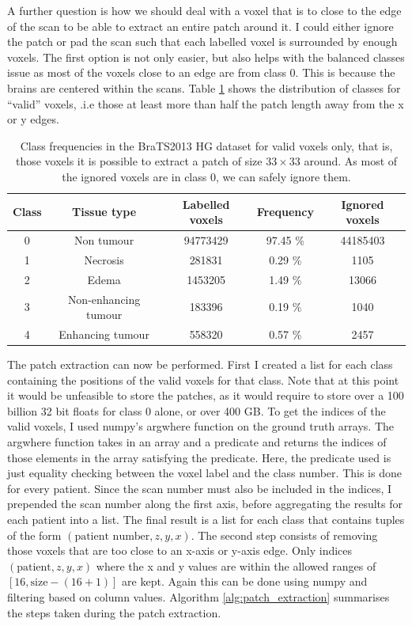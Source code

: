 \documentclass[12pt,a4paper,twoside,openright]{report}
\begin{document}
A further question is how we should deal with a voxel that is to close to the edge of the scan to be able to extract an entire patch around it. I could either ignore the patch or pad the scan such that each labelled voxel is surrounded by enough voxels. The first option is not only easier, but also helps with the balanced classes issue as most of the voxels close to an edge are from class 0. This is because the brains are centered within the scans. Table \ref{table:valid_class_frequencies} shows the distribution of classes for ``valid'' voxels, .i.e those at least more than half the patch length away from the x or y edges.
\begin{table}[h]
\centering	
\label{table:valid_class_frequencies}
\begin{tabular}{c c S[table-format=9.0] S[table-format=2.2] S[table-format=8.0]}
\textbf{Class} & \textbf{Tissue type} & \textbf{Labelled voxels} & \textbf{Frequency} & \textbf{Ignored voxels}\\
  & Non tumour 				& 94773429 	& 97.45 \% & 44185403 \\ 
1 & Necrosis 				& 281831 	& 0.29 \% & 1105\\ 
2 & Edema					& 1453205 	& 1.49 \% & 13066\\ 
3 & Non-enhancing tumour 	& 183396 	& 0.19 \% & 1040\\ 
4 & Enhancing tumour		& 558320 	& 0.57 \% & 2457\\

\end{tabular}
\caption{Class frequencies in the BraTS2013 HG dataset for valid voxels only, that is, those voxels it is possible to extract a patch of size $33 \times 33$ around. As most of the ignored voxels are in class 0, we can safely ignore them.}
\end{table}

The patch extraction can now be performed. First I created a list for each class containing the positions of the valid voxels for that class. Note that at this point it would be unfeasible to store the patches, as it would require to store over a 100 billion 32 bit floats for class 0 alone, or over 400 GB. To get the indices of the valid voxels, I used numpy's argwhere function on the ground truth arrays. The argwhere function takes in an array and a predicate and returns the indices of those elements in the array satisfying the predicate. Here, the predicate used is just equality checking between the voxel label and the class number. This is done for every patient. Since the scan number must also be included in the indices, I prepended the scan number along the first axis, before aggregating the results for each patient into a list. The final result is a list for each class that contains tuples of the form $(\text{patient number}, z, y, x)$. The second step consists of removing those voxels that are too close to an x-axis or y-axis edge. Only indices $(\text{patient}, z, y, x)$ where the x and y values are  within the allowed ranges of $[16, \text{size}-(16+1)]$ are kept. Again this can be done using numpy and filtering based on column values. Algorithm \ref{alg:patch_extraction} summarises the steps taken during the patch extraction.
\end{document}

